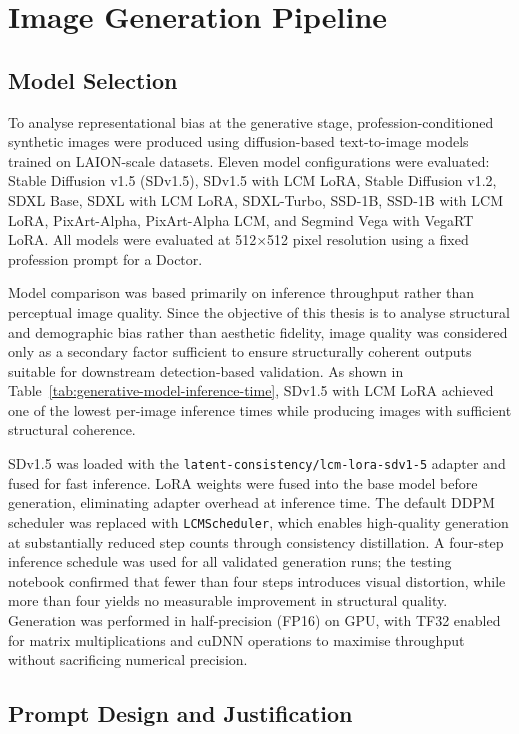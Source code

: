 \section{Image Generation Pipeline}

\subsection{Model Selection}

To analyse representational bias at the generative stage, profession-conditioned synthetic images were produced using diffusion-based text-to-image models trained on LAION-scale datasets. Eleven model configurations were evaluated: Stable Diffusion v1.5 (SDv1.5), SDv1.5 with LCM LoRA, Stable Diffusion v1.2, SDXL Base, SDXL with LCM LoRA, SDXL-Turbo, SSD-1B, SSD-1B with LCM LoRA, PixArt-Alpha, PixArt-Alpha LCM, and Segmind Vega with VegaRT LoRA. All models were evaluated at 512$\times$512 pixel resolution using a fixed profession prompt for a Doctor.

Model comparison was based primarily on inference throughput rather than perceptual image quality. Since the objective of this thesis is to analyse structural and demographic bias rather than aesthetic fidelity, image quality was considered only as a secondary factor sufficient to ensure structurally coherent outputs suitable for downstream detection-based validation. As shown in Table~\ref{tab:generative-model-inference-time}, SDv1.5 with LCM LoRA achieved one of the lowest per-image inference times while producing images with sufficient structural coherence.

SDv1.5 was loaded with the \texttt{latent-consistency/lcm-lora-sdv1-5} adapter and fused for fast inference. LoRA weights were fused into the base model before generation, eliminating adapter overhead at inference time. The default DDPM scheduler was replaced with \texttt{LCMScheduler}, which enables high-quality generation at substantially reduced step counts through consistency distillation. A four-step inference schedule was used for all validated generation runs; the testing notebook confirmed that fewer than four steps introduces visual distortion, while more than four yields no measurable improvement in structural quality. Generation was performed in half-precision (FP16) on GPU, with TF32 enabled for matrix multiplications and cuDNN operations to maximise throughput without sacrificing numerical precision.

\subsection{Prompt Design and Justification}

